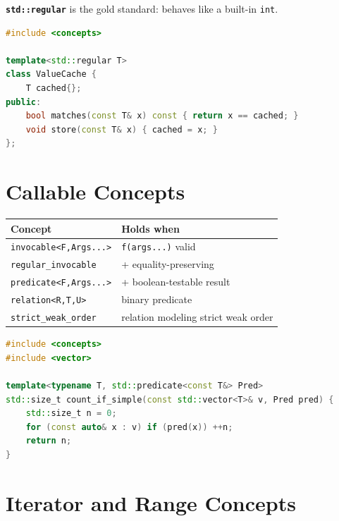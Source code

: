 \textbf{\texttt{std::regular}} is the gold standard: behaves like a built-in \texttt{int}.

\begin{lstlisting}[language=C++,caption={A component requiring regular value semantics}]
#include <concepts>

template<std::regular T>
class ValueCache {
    T cached{};
public:
    bool matches(const T& x) const { return x == cached; }
    void store(const T& x) { cached = x; }
};
\end{lstlisting}

\section{Callable Concepts}
\label{sec:c20-callable-concepts}

\begin{center}
\begin{tabular}{ll}
\hline
\textbf{Concept} & \textbf{Holds when} \\
\hline
\texttt{invocable<F,Args...>} & \texttt{f(args...)} valid \\
\texttt{regular\_invocable} & + equality-preserving \\
\texttt{predicate<F,Args...>} & + boolean-testable result \\
\texttt{relation<R,T,U>} & binary predicate \\
\texttt{strict\_weak\_order} & relation modeling strict weak order \\
\hline
\end{tabular}
\end{center}

\begin{lstlisting}[language=C++,caption={Constraining a higher-order function on std::predicate}]
#include <concepts>
#include <vector>

template<typename T, std::predicate<const T&> Pred>
std::size_t count_if_simple(const std::vector<T>& v, Pred pred) {
    std::size_t n = 0;
    for (const auto& x : v) if (pred(x)) ++n;
    return n;
}
\end{lstlisting}

\section{Iterator and Range Concepts}
\label{sec:c20-iter-range-concepts}

